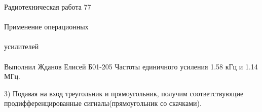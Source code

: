 \documentclass{astroedu-lab}
\begin{document}
\begin{problem}{\huge Радиотехническая работа 77\\\\Применение операционных\\\\усилителей\\\\Выполнил Жданов Елисей Б01-205}
Частоты единичного усиления 1.58 кГц и 1.14 МГц.

3) Подавая на вход треугольник и прямоугольник, получим соответствующие продифференцированные сигналы(прямоугольник со скачками).


%
%
%
%
%
%
%
%
%
%
%

\end{problem}
\end{document}
